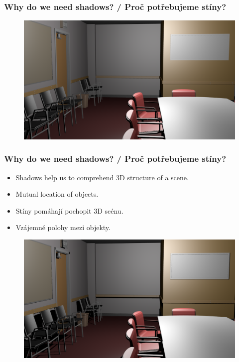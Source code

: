\begin{frame}\frametitle{Why do we need shadows? / Proč potřebujeme stíny?}
  \begin{figure}[h]
    \includegraphics[width=11.5cm,keepaspectratio]{pics/shadows/whyShadows/conferenceNoShadows}
  \end{figure}
\end{frame}

\begin{frame}\frametitle{Why do we need shadows? / Proč potřebujeme stíny?}\scriptsize
  \begin{itemize}
    \item Shadows help us to comprehend 3D structure of a scene.
    \item Mutual location of objects.
  \end{itemize}
  \begin{itemize}
    \item Stíny pomáhají pochopit 3D scénu.
    \item Vzájemné polohy mezi objekty.
  \end{itemize}
  \begin{figure}[h]
    \includegraphics[width=11.5cm,keepaspectratio]{pics/shadows/whyShadows/conferenceShadows}
  \end{figure}
\end{frame}

